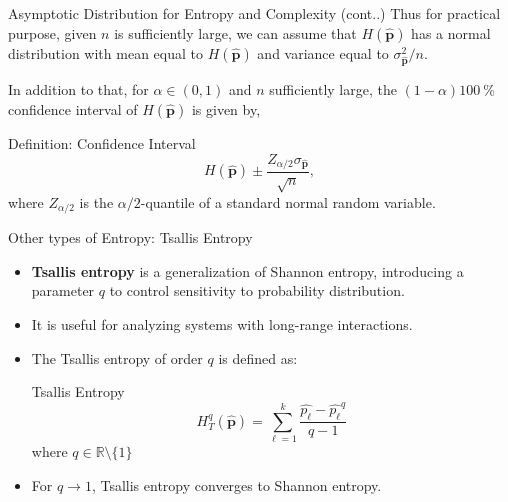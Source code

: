 \documentclass{beamer}
\begin{document}
\begin{frame}{Asymptotic Distribution for Entropy and Complexity (cont..)}
	Thus for practical purpose, given $n$ is sufficiently large, we can assume that $H(\widehat{\mathbf{p}})$ has a normal distribution with mean equal to $H(\widehat{\mathbf{p}})$ and variance equal to $\sigma^2_{\widehat{\mathbf{p}}}/n$.
	
	In addition to that, for $\alpha\in(0,1)$ and $n$ sufficiently large, the $(1-\alpha)\SI{100}{\percent}$ confidence interval of $H(\widehat{\mathbf{p}})$ is given by, 
	\begin{block}{Definition: Confidence Interval}
		\[
		H(\widehat{\mathbf{p}})\pm \dfrac{Z_{\alpha/2}\sigma_{\widehat{\mathbf{p}}}}{\sqrt{n}},
		\label{eq:ConfidenceInterval}
		\]
		where $Z_{\alpha/2}$ is the $\alpha/2$-quantile of a standard normal random variable.
	\end{block} 
\end{frame}



\begin{frame}{Other types of Entropy: Tsallis Entropy}
	\begin{itemize}
		\item \textbf{Tsallis entropy} is a generalization of Shannon entropy, introducing a parameter $q$ to control sensitivity to probability distribution.
		\item It is useful for analyzing systems with long-range interactions.
		\item The Tsallis entropy of order $q$ is defined as:
		\begin{block}{Tsallis Entropy}
			\[
			H_{T}^{q}(\widehat{\mathbf{p}}) = \sum_{\ell=1}^{k} \frac{\widehat{p_\ell} - \widehat{p_\ell}^q}{q-1}
			\]
			where $q \in \mathbb{R} \setminus \{1\}$
		\end{block}
		\item For $q \to 1$, Tsallis entropy converges to Shannon entropy.
	\end{itemize}
\end{frame}
\end{document}
